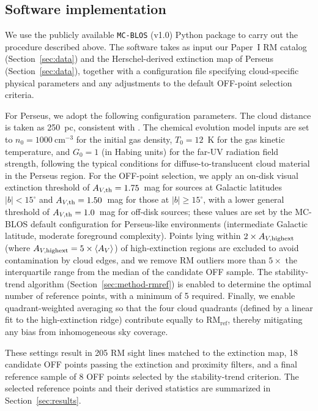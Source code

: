 \documentclass[twocolumn]{aastex631}
\begin{document}
\subsection{Software implementation}
\label{sec:method-implementation}

We use the publicly available \texttt{MC-BLOS} (v1.0) Python package \citep{tahani2025mcblos} to carry out the procedure described above. The software takes as input our Paper~I RM catalog (Section~\ref{sec:data}) and the Herschel-derived extinction map of Perseus (Section~\ref{sec:data}), together with a configuration file specifying cloud-specific physical parameters and any adjustments to the default OFF-point selection criteria.

For Perseus, we adopt the following configuration parameters. The cloud distance is taken as 250~pc, consistent with \citet{zucker2018}. The chemical evolution model inputs are set to $n_0 = 1000~\mathrm{cm^{-3}}$ for the initial gas density, $T_0 = 12$~K for the gas kinetic temperature, and $G_0 = 1$ (in Habing units) for the far-UV radiation field strength, following the typical conditions for diffuse-to-translucent cloud material in the Perseus region. For the OFF-point selection, we apply an on-disk visual extinction threshold of $A_{V,\rm th} = 1.75$~mag for sources at Galactic latitudes $|b| < 15^\circ$ and $A_{V,\rm th} = 1.50$~mag for those at $|b| \geq 15^\circ$, with a lower general threshold of $A_{V,\rm th} = 1.0$~mag for off-disk sources; these values are set by the MC-BLOS default configuration for Perseus-like environments (intermediate Galactic latitude, moderate foreground complexity). Points lying within $2 \times A_{V,\rm highext}$ (where $A_{V,\rm highext} = 5 \times \langle A_V \rangle$) of high-extinction regions are excluded to avoid contamination by cloud edges, and we remove RM outliers more than $5\times$ the interquartile range from the median of the candidate OFF sample. The stability-trend algorithm (Section~\ref{sec:method-rmref}) is enabled to determine the optimal number of reference points, with a minimum of 5 required. Finally, we enable quadrant-weighted averaging so that the four cloud quadrants (defined by a linear fit to the high-extinction ridge) contribute equally to $\mathrm{RM_{ref}}$, thereby mitigating any bias from inhomogeneous sky coverage.

These settings result in 205 RM sight lines matched to the extinction map, 18 candidate OFF points passing the extinction and proximity filters, and a final reference sample of 8 OFF points selected by the stability-trend criterion. The selected reference points and their derived statistics are summarized in Section~\ref{sec:results}.
\end{document}
